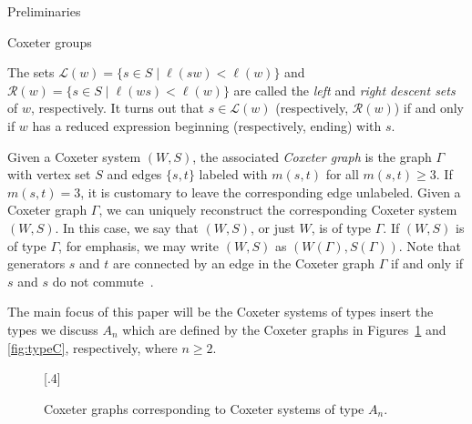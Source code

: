 \documentclass[11pt]{amsart}
\theoremstyle{definition}
\numberwithin{equation}{section}
\newcommand{\C}{\widetilde{C}}
\newcommand{\x}{\mathsf{x}}
\renewcommand{\L}{\mathcal{L}}
\newcommand{\R}{\mathcal{R}}
\renewcommand{\(}{\left(}
\renewcommand{\)}{\right)}
\newcommand{\w}{\mathsf{w}}
\begin{document}
\begin{section}{Preliminaries}
\begin{subsection}{Coxeter groups}

The sets $\L(w)=\{s \in S\mid \ell(sw) < \ell(w)\}$ and $\R(w)=\{s \in S\mid \ell(ws) < \ell(w)\}$ are called the \emph{left} and \emph{right descent sets} of $w$, respectively.  It turns out that $s \in \L(w)$ (respectively, $\R(w)$) if and only if $w$ has a reduced expression beginning (respectively, ending) with $s$.

Given a Coxeter system $(W,S)$, the associated \emph{Coxeter graph} is the graph $\Gamma$ with vertex set $S$ and edges $\{s,t\}$ labeled with $m(s,t)$ for all $m(s,t)\geq 3$.  If $m(s,t)=3$, it is customary to leave the corresponding edge unlabeled.  Given a Coxeter graph $\Gamma$, we can uniquely reconstruct the corresponding Coxeter system $(W,S)$.  In this case, we say that $(W,S)$, or just $W$, is of type $\Gamma$. If $(W,S)$ is of type $\Gamma$, for emphasis, we may write $(W,S)$ as $(W(\Gamma),S(\Gamma))$.  Note that generators $s$ and $t$ are connected by an edge in the Coxeter graph $\Gamma$ if and only if $s$ and $s$ do not commute~\cite{Humphreys1990}.

The main focus of this paper will be the Coxeter systems of types {\color{red} insert the types we discuss} $A_n$ which are defined by the Coxeter graphs in Figures~\ref{fig:typeA} and \ref{fig:typeC}, respectively, where $n\geq 2$.

\begin{figure}[!ht]
[.4\textwidth]{
}
\caption{Coxeter graphs corresponding to Coxeter systems of type $A_{n}$.}\label{fig:typeA}
\end{figure}


\end{subsection}
\end{section}
\end{document}
